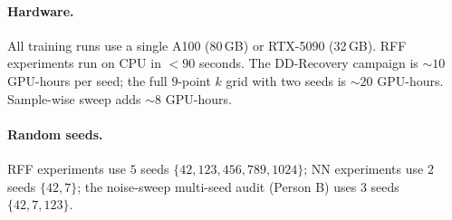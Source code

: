 \documentclass{article}
\begin{document}
\paragraph{Hardware.} All training runs use a single A100 (80\,GB) or RTX-5090 (32\,GB). RFF experiments run on CPU in $<\!90$ seconds. The DD-Recovery campaign is $\sim$$10$ GPU-hours per seed; the full $9$-point $k$ grid with two seeds is $\sim$$20$ GPU-hours. Sample-wise sweep adds $\sim$$8$ GPU-hours.

\paragraph{Random seeds.} RFF experiments use $5$ seeds $\{42, 123, 456, 789, 1024\}$; NN experiments use $2$ seeds $\{42, 7\}$; the noise-sweep multi-seed audit (Person B) uses $3$ seeds $\{42, 7, 123\}$.
\end{document}
